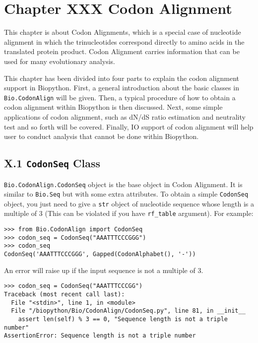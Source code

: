 \documentclass{article}
\begin{document}
\section{Chapter XXX Codon Alignment}

This chapter is about Codon Alignments, which is a special case of
nucleotide alignment in which the trinucleotides correspond directly to
amino acids in the translated protein product. Codon Alignment carries
information that can be used for many evolutionary analysis.

This chapter has been divided into four parts to explain the codon
alignment support in Biopython. First, a general introduction about the
basic classes in \texttt{Bio.CodonAlign} will be given. Then, a typical
procedure of how to obtain a codon alignment within Biopython is then
discussed. Next, some simple applications of codon alignment, such as
dN/dS ratio estimation and neutrality test and so forth will be covered.
Finally, IO support of codon alignment will help user to conduct
analysis that cannot be done within Biopython.

\subsection{X.1 \texttt{CodonSeq} Class}

\texttt{Bio.CodonAlign.CodonSeq} object is the base object in Codon
Alignment. It is similar to \texttt{Bio.Seq} but with some extra
attributes. To obtain a simple \texttt{CodonSeq} object, you just need
to give a \texttt{str} object of nucleotide sequence whose length is a
multiple of 3 (This can be violated if you have \texttt{rf\_table}
argument). For example:

\begin{verbatim}
>>> from Bio.CodonAlign import CodonSeq
>>> codon_seq = CodonSeq("AAATTTCCCGGG")
>>> codon_seq
CodonSeq('AAATTTCCCGGG', Gapped(CodonAlphabet(), '-'))
\end{verbatim}

An error will raise up if the input sequence is not a multiple of 3.

\begin{verbatim}
>>> codon_seq = CodonSeq("AAATTTCCCGG")
Traceback (most recent call last):
  File "<stdin>", line 1, in <module>
  File "/biopython/Bio/CodonAlign/CodonSeq.py", line 81, in __init__
    assert len(self) % 3 == 0, "Sequence length is not a triple number"
AssertionError: Sequence length is not a triple number
\end{verbatim}
\end{document}
